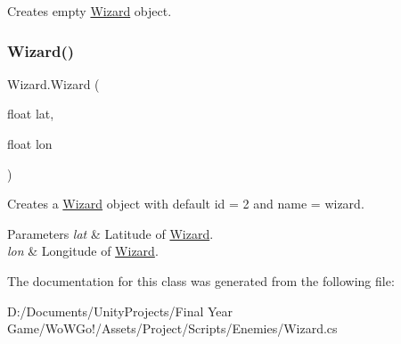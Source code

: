 Creates empty \mbox{\hyperlink{class_wizard}{Wizard}} object. 

\mbox{\label{class_wizard_adf1af8eec90b862b7456921d638f40ad}} 
\subsubsection{\texorpdfstring{Wizard()}{Wizard()}\hspace{0.1cm}{\footnotesize\ttfamily [2/2]}}
{\footnotesize\ttfamily Wizard.\+Wizard (\begin{DoxyParamCaption}\item[{float}]{lat,  }\item[{float}]{lon }\end{DoxyParamCaption})}



Creates a \mbox{\hyperlink{class_wizard}{Wizard}} object with default id = 2 and name = wizard. 


\begin{DoxyParams}{Parameters}
{\em lat} & Latitude of \mbox{\hyperlink{class_wizard}{Wizard}}.\\
\hline
{\em lon} & Longitude of \mbox{\hyperlink{class_wizard}{Wizard}}.\\
\hline
\end{DoxyParams}


The documentation for this class was generated from the following file\+:\begin{DoxyCompactItemize}
\item 
D\+:/\+Documents/\+Unity\+Projects/\+Final Year Game/\+Wo\+W\+Go!/\+Assets/\+Project/\+Scripts/\+Enemies/Wizard.\+cs\end{DoxyCompactItemize}
